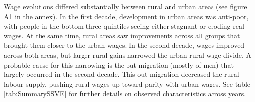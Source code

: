 Wage evolutions differed substantially between rural and urban areas (see figure A1 in the annex). In the first decade, development in urban areas was anti-poor, with people in the bottom three quintiles seeing either stagnant or eroding real wages. At the same time, rural areas saw improvements across all groups that brought them closer to the urban wages. In the second decade, wages improved across both areas, but larger rural gains narrowed the urban-rural wage divide. A probable cause for this narrowing is the out-migration (mostly of men) that largely occurred in the second decade. This out-migration decreased the rural labour supply, pushing rural wages up toward parity with urban wages. See table \ref{tab:SummarySSVE} for further details on observed characteristics across years.\par 






